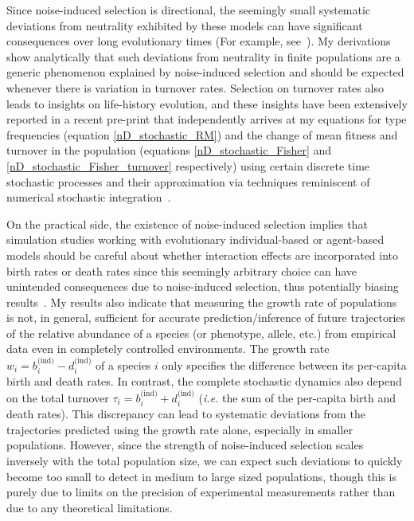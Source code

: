 Since noise-induced selection is directional, the seemingly small systematic deviations from neutrality exhibited by these models can have significant consequences over long evolutionary times (For example, see~\cite{veller_drift-induced_2017}). My derivations show analytically that such deviations from neutrality in finite populations are a generic phenomenon explained by noise-induced selection and should be expected whenever there is variation in turnover rates. Selection on turnover rates also leads to insights on life-history evolution, and these insights have been extensively reported in a recent pre-print that independently arrives at my equations for type frequencies (equation \eqref{nD_stochastic_RM}) and the change of mean fitness and turnover in the population (equations \eqref{nD_stochastic_Fisher} and \eqref{nD_stochastic_Fisher_turnover} respectively) using certain discrete time stochastic processes and their approximation via techniques reminiscent of numerical stochastic integration~\citep{kuosmanen_turnover_2022}. 

On the practical side, the existence of noise-induced selection implies that simulation studies working with evolutionary individual-based or agent-based models should be careful about whether interaction effects are incorporated into birth rates or death rates since this seemingly arbitrary choice can have unintended consequences due to noise-induced selection, thus potentially biasing results~\citep{mcleod_social_2019,kuosmanen_turnover_2022}. My results also indicate that measuring the growth rate of populations is not, in general, sufficient for accurate prediction/inference of future trajectories of the relative abundance of a species (or phenotype, allele, etc.) from empirical data even in completely controlled environments. The growth rate $w_i = b^{\textrm{(ind)}}_{i} - d^{\textrm{(ind)}}_{i}$ of a species $i$ only specifies the difference between its per-capita birth and death rates. In contrast, the complete stochastic dynamics also depend on the total turnover $\tau_i = b^{\textrm{(ind)}}_{i} + d^{\textrm{(ind)}}_{i}$ (\emph{i.e.} the sum of the per-capita birth and death rates). This discrepancy can lead to systematic deviations from the trajectories predicted using the growth rate alone, especially in smaller populations. However, since the strength of noise-induced selection scales inversely with the total population size, we can expect such deviations to quickly become too small to detect in medium to large sized populations, though this is purely due to limits on the precision of experimental measurements rather than due to any theoretical limitations.

